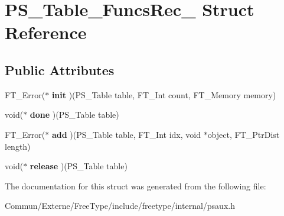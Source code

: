 \hypertarget{struct_p_s___table___funcs_rec__}{}\section{P\+S\+\_\+\+Table\+\_\+\+Funcs\+Rec\+\_\+ Struct Reference}
\label{struct_p_s___table___funcs_rec__}
\subsection*{Public Attributes}
\begin{DoxyCompactItemize}
\item 
F\+T\+\_\+\+Error($\ast$ {\bfseries init} )(P\+S\+\_\+\+Table table, F\+T\+\_\+\+Int count, F\+T\+\_\+\+Memory memory)\hypertarget{struct_p_s___table___funcs_rec___a5ac6b9ff3cb3bec352235cecea5c6def}{}\label{struct_p_s___table___funcs_rec___a5ac6b9ff3cb3bec352235cecea5c6def}

\item 
void($\ast$ {\bfseries done} )(P\+S\+\_\+\+Table table)\hypertarget{struct_p_s___table___funcs_rec___ae358c8c8f5ae26f58c136993ddac6276}{}\label{struct_p_s___table___funcs_rec___ae358c8c8f5ae26f58c136993ddac6276}

\item 
F\+T\+\_\+\+Error($\ast$ {\bfseries add} )(P\+S\+\_\+\+Table table, F\+T\+\_\+\+Int idx, void $\ast$object, F\+T\+\_\+\+Ptr\+Dist length)\hypertarget{struct_p_s___table___funcs_rec___a007697f5aebe1dc71b2a3e01d152a9b5}{}\label{struct_p_s___table___funcs_rec___a007697f5aebe1dc71b2a3e01d152a9b5}

\item 
void($\ast$ {\bfseries release} )(P\+S\+\_\+\+Table table)\hypertarget{struct_p_s___table___funcs_rec___aa593cc617f0caf908d7d7f3dd770fab5}{}\label{struct_p_s___table___funcs_rec___aa593cc617f0caf908d7d7f3dd770fab5}

\end{DoxyCompactItemize}


The documentation for this struct was generated from the following file\+:\begin{DoxyCompactItemize}
\item 
Commun/\+Externe/\+Free\+Type/include/freetype/internal/psaux.\+h\end{DoxyCompactItemize}
